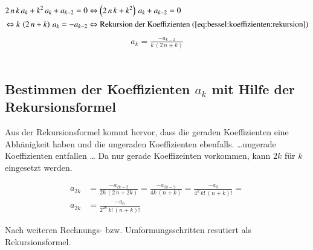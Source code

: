 \begin{align*}
	2 \, n \, k \, a_k
	+
	k^2 \, a_k
	+
	a_{k - 2}
	= 0
	&\Leftrightarrow
	\left(
	2 \, n \, k 
	+
	k^2 
	\right)
	\, a_k
	+
	a_{k - 2}
	= 0 \\
	\Leftrightarrow
	k \,
	\left(
	2 \, n
	+
	k
	\right)
	\, a_k
	= -a_{k - 2}
	&\Leftrightarrow
	\text{Rekursion der Koeffizienten \refeq{eq:bessel:koeffizienten:rekursion}}
\end{align*}
\begin{align}
	a_k
	=
	\frac
	{
		-a_{k - 2}
	}{
		k \, \left( 2 \, n + k \right)	
	}
	\label{eq:bessel:koeffizienten:rekursion}
\end{align}
\\
\subsection[Bestimmen der Koeffizienten $a_k$]{Bestimmen der Koeffizienten $a_k$ mit Hilfe der Rekursionsformel }
\begin{normalsize}
	Aus der Rekursionsformel  kommt hervor,
	dass die geraden Koeffizienten eine Abh\"anigkeit haben und die ungeraden Koeffizienten ebenfalls.
	\dots ungerade Koeffizienten entfallen \dots
	Da nur gerade Koeffizeinten vorkommen,
	kann $2k$ f\"ur $k$ eingesetzt werden.
\end{normalsize}
\begin{align}
	\nonumber
	a_{2k}
	&=
	\frac
	{
		-a_{2k - 2}
	}{
		2k \, \left( 2 \, n + 2k \right)	
	}
	=
	\frac
	{
		-a_{2k - 2}
	}{
		4k \, \left( n + k \right)	
	} 
	=
	\frac
	{
		-a_0
	}{
		4^k \, {k}! \, {\left( n + k \right)}!
	}
	=
	\\
	a_{2k}
	&= 
	\frac
	{
		-a_0
	}{
		2^{2k} \, {k}! \, {\left( n + k \right)}!
	}
	\label{eq:bessel:koeffizienten:gerade}
\end{align}
\begin{normalsize}
	Nach weiteren Rechnungs- bzw. Umformungsschritten resutiert  als Rekursionsformel.
\end{normalsize}
